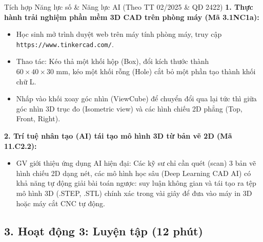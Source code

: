 \documentclass[12pt, a4paper]{article}
\begin{document}
\begin{aibox}{Tích hợp Năng lực số \& Năng lực AI (Theo TT 02/2025 \& QĐ 2422)}
    \textbf{1. Thực hành trải nghiệm phần mềm 3D CAD trên phòng máy (Mã 3.1NC1a):}
    \begin{itemize}[leftmargin=0.6cm]
        \item Học sinh mở trình duyệt web trên máy tính phòng máy, truy cập \texttt{https://www.tinkercad.com/}.
        \item Thao tác: Kéo thả một khối hộp (Box), đổi kích thước thành $60 \times 40 \times 30\text{ mm}$, kéo một khối rỗng (Hole) cắt bỏ một phần tạo thành khối chữ L.
        \item Nhấp vào khối xoay góc nhìn (ViewCube) để chuyển đổi qua lại tức thì giữa góc nhìn 3D trục đo (Isometric view) và các hình chiếu 2D phẳng (Top, Front, Right).
    \end{itemize}
    \textbf{2. Trí tuệ nhân tạo (AI) tái tạo mô hình 3D từ bản vẽ 2D (Mã 11.C2.2):}
    \begin{itemize}[leftmargin=0.6cm]
        \item GV giới thiệu ứng dụng AI hiện đại: Các kỹ sư chỉ cần quét (scan) 3 bản vẽ hình chiếu 2D dạng nét, các mô hình học sâu (Deep Learning CAD AI) có khả năng tự động giải bài toán ngược: suy luận không gian và tái tạo ra tệp mô hình 3D (.STEP, .STL) chính xác trong vài giây để đưa vào máy in 3D hoặc máy cắt CNC tự động.
    \end{itemize}
\end{aibox}

\subsection*{3. Hoạt động 3: Luyện tập (12 phút)}
\end{document}
